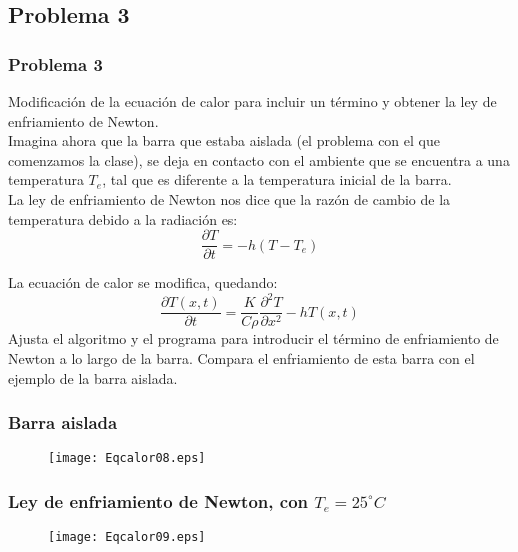 \subsection{Problema 3}
\begin{frame}
\frametitle{Problema 3}
Modificación de la ecuación de calor para incluir un término y obtener la ley de enfriamiento de Newton.
\\
\bigskip
Imagina ahora que la barra que estaba aislada (el problema con el que comenzamos la clase), se deja en contacto con el ambiente que se encuentra a una temperatura $T_{e}$, tal que es diferente a la temperatura inicial de la barra.
\\
\bigskip
La ley de enfriamiento de Newton nos dice que la razón de cambio de la temperatura debido a la radiación es:
\[ \dfrac{\partial T}{\partial t} = - h (T- T_{e}) \]
\end{frame}
\begin{frame}
La ecuación de calor se modifica, quedando:
\[ \dfrac{\partial T(x,t)}{\partial t} = \dfrac{K}{C \rho} \dfrac{\partial^{2}T}{\partial x^{2}} - h T(x,t)\]
Ajusta el algoritmo y el programa para introducir el término de enfriamiento de Newton a lo largo de la barra. Compara el enfriamiento de esta barra con el ejemplo de la barra aislada.
\end{frame}
\begin{frame}
\frametitle{Barra aislada}
\begin{figure}
	\centering
	\texttt{[image: Eqcalor08.eps]}  
\end{figure}
\end{frame}
\begin{frame}
\frametitle{Ley de enfriamiento de Newton, con $T_{e}=25^{\circ}C$}
\begin{figure}
	\centering
	\texttt{[image: Eqcalor09.eps]}  
\end{figure}
\end{frame}
